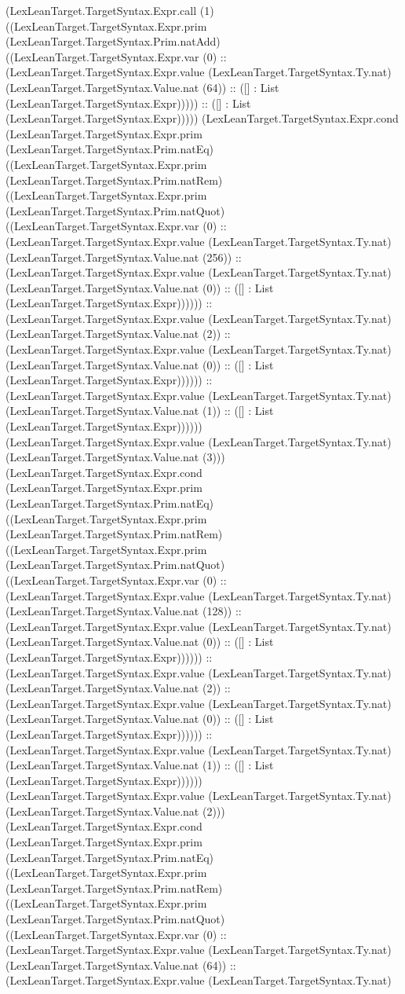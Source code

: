 \documentclass[11pt]{article}
\begin{document}
(LexLeanTarget.TargetSyntax.Expr.call (1) ((LexLeanTarget.TargetSyntax.Expr.prim (LexLeanTarget.TargetSyntax.Prim.natAdd) ((LexLeanTarget.TargetSyntax.Expr.var (0) :: (LexLeanTarget.TargetSyntax.Expr.value (LexLeanTarget.TargetSyntax.Ty.nat) (LexLeanTarget.TargetSyntax.Value.nat (64)) :: ([] : List (LexLeanTarget.TargetSyntax.Expr))))) :: ([] : List (LexLeanTarget.TargetSyntax.Expr))))) (LexLeanTarget.TargetSyntax.Expr.cond (LexLeanTarget.TargetSyntax.Expr.prim (LexLeanTarget.TargetSyntax.Prim.natEq) ((LexLeanTarget.TargetSyntax.Expr.prim (LexLeanTarget.TargetSyntax.Prim.natRem) ((LexLeanTarget.TargetSyntax.Expr.prim (LexLeanTarget.TargetSyntax.Prim.natQuot) ((LexLeanTarget.TargetSyntax.Expr.var (0) :: (LexLeanTarget.TargetSyntax.Expr.value (LexLeanTarget.TargetSyntax.Ty.nat) (LexLeanTarget.TargetSyntax.Value.nat (256)) :: (LexLeanTarget.TargetSyntax.Expr.value (LexLeanTarget.TargetSyntax.Ty.nat) (LexLeanTarget.TargetSyntax.Value.nat (0)) :: ([] : List (LexLeanTarget.TargetSyntax.Expr)))))) :: (LexLeanTarget.TargetSyntax.Expr.value (LexLeanTarget.TargetSyntax.Ty.nat) (LexLeanTarget.TargetSyntax.Value.nat (2)) :: (LexLeanTarget.TargetSyntax.Expr.value (LexLeanTarget.TargetSyntax.Ty.nat) (LexLeanTarget.TargetSyntax.Value.nat (0)) :: ([] : List (LexLeanTarget.TargetSyntax.Expr)))))) :: (LexLeanTarget.TargetSyntax.Expr.value (LexLeanTarget.TargetSyntax.Ty.nat) (LexLeanTarget.TargetSyntax.Value.nat (1)) :: ([] : List (LexLeanTarget.TargetSyntax.Expr)))))) (LexLeanTarget.TargetSyntax.Expr.value (LexLeanTarget.TargetSyntax.Ty.nat) (LexLeanTarget.TargetSyntax.Value.nat (3))) (LexLeanTarget.TargetSyntax.Expr.cond (LexLeanTarget.TargetSyntax.Expr.prim (LexLeanTarget.TargetSyntax.Prim.natEq) ((LexLeanTarget.TargetSyntax.Expr.prim (LexLeanTarget.TargetSyntax.Prim.natRem) ((LexLeanTarget.TargetSyntax.Expr.prim (LexLeanTarget.TargetSyntax.Prim.natQuot) ((LexLeanTarget.TargetSyntax.Expr.var (0) :: (LexLeanTarget.TargetSyntax.Expr.value (LexLeanTarget.TargetSyntax.Ty.nat) (LexLeanTarget.TargetSyntax.Value.nat (128)) :: (LexLeanTarget.TargetSyntax.Expr.value (LexLeanTarget.TargetSyntax.Ty.nat) (LexLeanTarget.TargetSyntax.Value.nat (0)) :: ([] : List (LexLeanTarget.TargetSyntax.Expr)))))) :: (LexLeanTarget.TargetSyntax.Expr.value (LexLeanTarget.TargetSyntax.Ty.nat) (LexLeanTarget.TargetSyntax.Value.nat (2)) :: (LexLeanTarget.TargetSyntax.Expr.value (LexLeanTarget.TargetSyntax.Ty.nat) (LexLeanTarget.TargetSyntax.Value.nat (0)) :: ([] : List (LexLeanTarget.TargetSyntax.Expr)))))) :: (LexLeanTarget.TargetSyntax.Expr.value (LexLeanTarget.TargetSyntax.Ty.nat) (LexLeanTarget.TargetSyntax.Value.nat (1)) :: ([] : List (LexLeanTarget.TargetSyntax.Expr)))))) (LexLeanTarget.TargetSyntax.Expr.value (LexLeanTarget.TargetSyntax.Ty.nat) (LexLeanTarget.TargetSyntax.Value.nat (2))) (LexLeanTarget.TargetSyntax.Expr.cond (LexLeanTarget.TargetSyntax.Expr.prim (LexLeanTarget.TargetSyntax.Prim.natEq) ((LexLeanTarget.TargetSyntax.Expr.prim (LexLeanTarget.TargetSyntax.Prim.natRem) ((LexLeanTarget.TargetSyntax.Expr.prim (LexLeanTarget.TargetSyntax.Prim.natQuot) ((LexLeanTarget.TargetSyntax.Expr.var (0) :: (LexLeanTarget.TargetSyntax.Expr.value (LexLeanTarget.TargetSyntax.Ty.nat) (LexLeanTarget.TargetSyntax.Value.nat (64)) :: (LexLeanTarget.TargetSyntax.Expr.value (LexLeanTarget.TargetSyntax.Ty.nat) 
\end{document}

